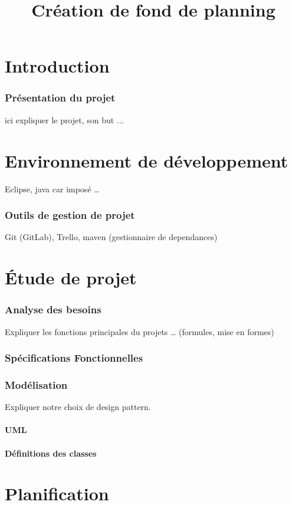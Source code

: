 \documentclass{polytech/polytech}
\title{Création de fond de planning}
\begin{document}
	\part{Introduction}
	\section{Présentation du projet}
	ici expliquer le projet, son but ...
	
	\part{Environnement de développement}
	Eclipse, java car imposé …
		
	\section{Outils de gestion de projet}
	Git (GitLab), Trello, maven (gestionnaire de dependances)
	
	\part{Étude de projet}
	\section{Analyse des besoins}
	Expliquer les fonctions principales du projets … (formules, mise en formes)
	
	\section{Spécifications Fonctionnelles}
	
	\section{Modélisation}
	Expliquer notre choix de design pattern.
	
	\subsection{UML}
	
	\subsection{Définitions des classes}
	
	\part{Planification}
	
\end{document}
